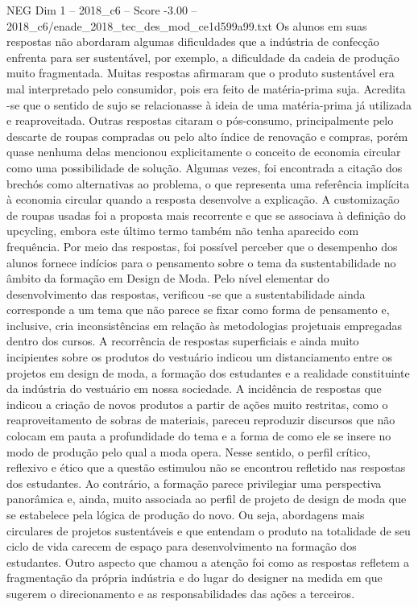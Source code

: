 \begin{textsample}{NEG Dim 1 – 2018\_c6 – Score -3.00 – 2018\_c6/enade\_2018\_tec\_des\_mod\_ce1d599a99.txt}
Os alunos em suas respostas não abordaram algumas dificuldades que a indústria de confecção enfrenta para ser sustentável, por exemplo, a dificuldade da cadeia de produção muito fragmentada.
Muitas respostas afirmaram que o produto sustentável era mal interpretado pelo consumidor, pois era feito de matéria-prima suja.
Acredita -se que o sentido de sujo se relacionasse à ideia de uma matéria-prima já utilizada e reaproveitada.
Outras respostas citaram o pós-consumo, principalmente pelo descarte de roupas compradas ou pelo alto índice de renovação e compras, porém quase nenhuma delas mencionou explicitamente o conceito de economia circular como uma possibilidade de solução.
Algumas vezes, foi encontrada a citação dos brechós como alternativas ao problema, o que representa uma referência implícita à economia circular quando a resposta desenvolve a explicação.
A customização de roupas usadas foi a proposta mais recorrente e que se associava à definição do upcycling, embora este último termo também não tenha aparecido com frequência.
Por meio das respostas, foi possível perceber que o desempenho dos alunos fornece indícios para o pensamento sobre o tema da sustentabilidade no âmbito da formação em Design de Moda.
Pelo nível elementar do desenvolvimento das respostas, verificou -se que a sustentabilidade ainda corresponde a um tema que não parece se fixar como forma de pensamento e, inclusive, cria inconsistências em relação às metodologias projetuais empregadas dentro dos cursos.
A recorrência de respostas superficiais e ainda muito incipientes sobre os produtos do vestuário indicou um distanciamento entre os projetos em design de moda, a formação dos estudantes e a realidade constituinte da indústria do vestuário em nossa sociedade.
A incidência de respostas que indicou a criação de novos produtos a partir de ações muito restritas, como o reaproveitamento de sobras de materiais, pareceu reproduzir discursos que não colocam em pauta a profundidade do tema e a forma de como ele se insere no modo de produção pelo qual a moda opera.
Nesse sentido, o perfil crítico, reflexivo e ético que a questão estimulou não se encontrou refletido nas respostas dos estudantes.
Ao contrário, a formação parece privilegiar uma perspectiva panorâmica e, ainda, muito associada ao perfil de projeto de design de moda que se estabelece pela lógica de produção do novo.
Ou seja, abordagens mais circulares de projetos sustentáveis e que entendam o produto na totalidade de seu ciclo de vida carecem de espaço para desenvolvimento na formação dos estudantes.
Outro aspecto que chamou a atenção foi como as respostas refletem a fragmentação da própria indústria e do lugar do designer na medida em que sugerem o direcionamento e as responsabilidades das ações a terceiros.

\end{textsample}
